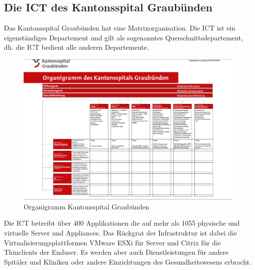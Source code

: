 \begin{flushleft}
    \subsection{Die ICT des Kantonsspital Graubünden}
    Das Kantonsspital Graubünden hat eine Matrixorganisation.
    Die ICT ist ein eigenständiges Departement und gilt als sogenanntes Querschnittsdepartement, dh.
    die ICT bedient alle anderen Departemente.
    \begin{figure}[H]
        \centering
        \includegraphics[width=0.75\linewidth]{source/introduction/initial_situation/Organigramm_KSGR}
        \caption{Organigramm Kantonsspital Graubünden}
        \label{fig:Organigramm_KSGR}
    \end{figure}
\end{flushleft}
\begin{flushleft}
    Die ICT betreibt über 400 Applikationen die auf mehr als 1055 physische und virtuelle Server und Appliances.
    Das Rückgrat der Infrastruktur ist dabei die Virtualisierungsplattformen VMware ESXi für Server und Citrix für die Thinclients der Enduser.
    Es werden aber auch Dienstleistungen für andere Spitäler und Kliniken oder andere Einrichtungen des Gesundheitswesens erbracht.
\end{flushleft}
